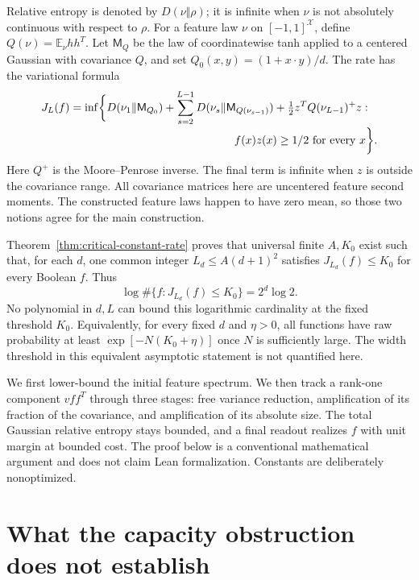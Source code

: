 \documentclass[11pt]{article}
\begin{document}
Relative entropy is denoted by $D(\nu\Vert\rho)$; it is infinite when
$\nu$ is not absolutely continuous with respect to $\rho$.
For a feature law $\nu$ on $[-1,1]^{\mathcal X}$, define
$Q(\nu)=\mathbb E_\nu hh^T$. Let $\mathsf M_Q$ be the law of
coordinatewise tanh applied to a centered Gaussian with covariance $Q$,
and set $Q_0(x,y)=(1+x\cdot y)/d$. The rate has the variational formula
\[
 \begin{split}
 J_L(f)=\inf\biggl\{&D(\nu_1\Vert\mathsf M_{Q_0})+
  \sum_{s=2}^{L-1}D(\nu_s\Vert\mathsf M_{Q(\nu_{s-1})})
  +\tfrac12 z^TQ(\nu_{L-1})^+z:\\[-2pt]
 &\hspace{40mm}f(x)z(x)\ge1/2\text{ for every }x\biggr\}.
 \end{split}
\]
Here $Q^+$ is the Moore--Penrose inverse. The final term is infinite
when $z$ is outside the covariance range.
All covariance matrices here are uncentered feature second moments.
The constructed feature laws happen to have zero mean, so those two
notions agree for the main construction.

Theorem~\ref{thm:critical-constant-rate} proves that universal finite
$A,K_0$ exist such that, for each $d$, one common integer
$L_d\le A(d+1)^2$ satisfies $J_{L_d}(f)\le K_0$ for every Boolean $f$.
Thus
\[
 \log\#\{f:J_{L_d}(f)\le K_0\}=2^d\log2.
\]
No polynomial in $d,L$ can bound this logarithmic cardinality at the
fixed threshold $K_0$. Equivalently, for every fixed $d$ and $\eta>0$,
all functions have raw probability at least
$\exp[-N(K_0+\eta)]$ once $N$ is sufficiently large. The width threshold
in this equivalent asymptotic statement is not quantified here.

We first lower-bound the initial feature spectrum. We then track a
rank-one component $vff^T$ through three stages: free variance reduction,
amplification of its fraction of the covariance, and amplification of its
absolute size. The total Gaussian relative entropy stays bounded, and a
final readout realizes $f$ with unit margin at bounded cost.
The proof below is a conventional mathematical argument and does not
claim Lean formalization. Constants are deliberately nonoptimized.




\section{What the capacity obstruction does not establish}
\end{document}
